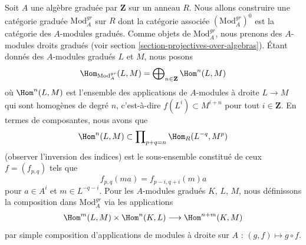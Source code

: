 \begin{example}
\label{example-gm-gr-cat}
Soit $A$ une algèbre graduée par $\mathbf{Z}$ sur un anneau $R$. Nous allons
construire une catégorie graduée $\text{Mod}^{gr}_A$ sur $R$ dont la catégorie associée
$(\text{Mod}^{gr}_A)^0$ est la catégorie des $A$-modules gradués. Comme objets de
$\text{Mod}^{gr}_A$, nous prenons des $A$-modules droits gradués (voir section
\ref{section-projectives-over-algebras}). Étant donnés des $A$-modules
gradués $L$ et $M$, nous posons
$$
\Hom_{\text{Mod}^{gr}_A}(L, M) =
\bigoplus\nolimits_{n \in \mathbf{Z}} \Hom^n(L, M)
$$
où $\Hom^n(L, M)$ est l'ensemble des applications de $A$-modules à droite $L \to
M$ qui sont homogènes de degré $n$, c'est-à-dire $f(L^i) \subset M^{i + n}$
pour tout $i \in \mathbf{Z}$. En termes de composantes, nous avons que
$$
\Hom^n(L, M) \subset \prod\nolimits_{p + q = n} \Hom_R(L^{-q}, M^p)
$$
(observer l'inversion des indices) est le sous-ensemble constitué de
ceux $f = (f_{p, q})$ tels que
$$
f_{p, q}(m a) = f_{p - i, q + i}(m)a
$$
pour $a \in A^i$ et $m \in L^{-q - i}$. Pour les $A$-modules gradués $K$,
$L$, $M$, nous définissons la composition dans $\text{Mod}^{gr}_A$ via les
applications
$$
\Hom^m(L, M) \times \Hom^n(K, L) \longrightarrow \Hom^{n + m}(K, M)
$$
par simple composition d'applications de modules à droite sur $A$ : $(g, f) \mapsto g \circ f$.
\end{example}

